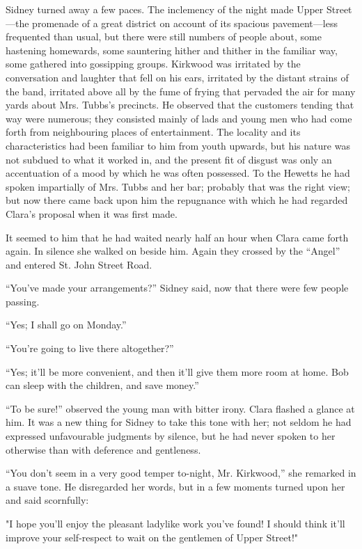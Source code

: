 Sidney turned away a few paces. The inclemency of the night made Upper
Street---the promenade of a great district on account of its spacious
pavement---less frequented than usual, but there were still numbers of
people about, some hastening homewards, some sauntering hither and
thither in the familiar way, some gathered into gossipping groups.
Kirkwood was irritated by the {}conversation and laughter that fell on
his ears, irritated by the distant strains of the band, irritated above
all by the fume of frying that pervaded the air for many yards about
Mrs. Tubbs's precincts. He observed that the customers tending that way
were numerous; they consisted mainly of lads and young men who had come
forth from neighbouring places of entertainment. The locality and its
characteristics had been familiar to him from youth upwards, but his
nature was not subdued to what it worked in, and the present fit of
disgust was only an accentuation of a mood by which he was often
possessed. To the Hewetts he had spoken impartially of Mrs. Tubbs and
her bar; probably that was the right view; but now there came back upon
him the repugnance with which he had regarded Clara's proposal when it
was first made.

It seemed to him that he had waited nearly half an hour when Clara came
forth again. In silence she walked on beside him. Again they crossed by
the ``Angel'' and entered St. John Street Road.

{}``You've made your arrangements?'' Sidney said, now that there were
few people passing.

``Yes; I shall go on Monday.''

``You're going to live there altogether?''

``Yes; it'll be more convenient, and then it'll give them more room at
home. Bob can sleep with the children, and save money.''

``To be sure!'' observed the young man with bitter irony. Clara flashed
a glance at him. It was a new thing for Sidney to take this tone with
her; not seldom he had expressed unfavourable judgments by silence, but
he had never spoken to her otherwise than with deference and gentleness.

``You don't seem in a very good temper to-night, Mr. Kirkwood,'' she
remarked in a suave tone. He disregarded her words, but in a few moments
turned upon her and said scornfully:

"I hope you'll enjoy the pleasant ladylike work you've found! I should
think it'll {}improve your self-respect to wait on the gentlemen of
Upper Street!"

